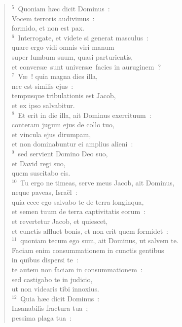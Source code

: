 \begin{flushleft}\begin{verse}${}^{5}$~Quoniam h\ae c dicit Dominus~:\\ Vocem terroris audivimus~:\\ formido, et non est pax.\\
${}^{6}$~Interrogate, et videte si generat masculus~:\\ quare ergo vidi omnis viri manum\\ super lumbum suum, quasi parturientis,\\ et convers\ae\ sunt univers\ae\ facies in auruginem~?\\
${}^{7}$~V\ae~! quia magna dies illa,\\ nec est similis ejus~:\\ tempusque tribulationis est Jacob,\\ et ex ipso salvabitur.\\
${}^{8}$~Et erit in die illa, ait Dominus exercituum~:\\ conteram jugum ejus de collo tuo,\\ et vincula ejus dirumpam,\\ et non dominabuntur ei amplius alieni~:\\
${}^{9}$~sed servient Domino Deo suo,\\ et David regi suo,\\ quem suscitabo eis.\\
${}^{10}$~Tu ergo ne timeas, serve meus Jacob, ait Dominus,\\ neque paveas, Isra\"el~:\\ quia ecce ego salvabo te de terra longinqua,\\ et semen tuum de terra captivitatis eorum~:\\ et revertetur Jacob, et quiescet,\\ et cunctis affluet bonis, et non erit quem formidet~:\\
${}^{11}$~quoniam tecum ego sum, ait Dominus, ut salvem te.\\ Faciam enim consummationem in cunctis gentibus\\ in quibus dispersi te~:\\ te autem non faciam in consummationem~:\\ sed castigabo te in judicio,\\ ut non videaris tibi innoxius.\\
${}^{12}$~Quia h\ae c dicit Dominus~:\\ Insanabilis fractura tua~;\\ pessima plaga tua~:\\

\end{verse}
\end{flushleft}
